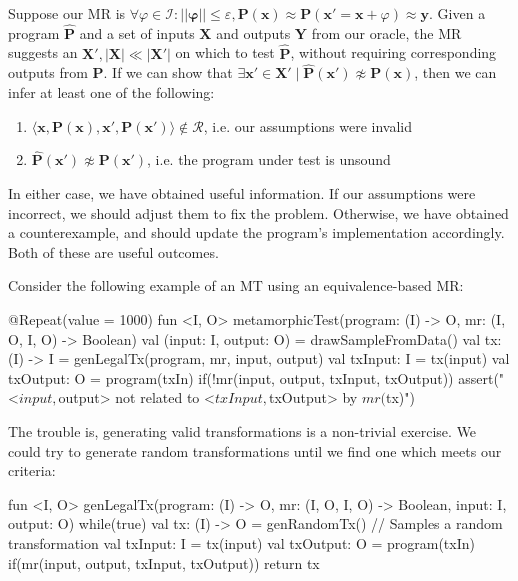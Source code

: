 \documentclass[12pt,initial,twoside,maitrise]{dms}
\numberwithin{equation}{section}
\numberwithin{table}{chapter}
\numberwithin{figure}{chapter}
\begin{document}
Suppose our MR is $\forall \varphi \in \mathcal I: ||\mathbf\varphi|| \leq \varepsilon, \mathbf P(\mathbf x) \approx \mathbf P(\mathbf x' = \mathbf x + \varphi) \approx \mathbf y$. Given a program $\mathbf{\hat P}$ and a set of inputs $\mathbf X$ and outputs $\mathbf Y$ from our oracle, the MR suggests an $\mathbf X', |\mathbf X| \ll |\mathbf X'|$ on which to test $\mathbf{\hat P}$, without requiring corresponding outputs from $\mathbf P$. If we can show that $\exists \mathbf x' \in \mathbf X' \mid \mathbf{\hat P}(\mathbf x') \not\approx \mathbf P(\mathbf x)$, then we can infer at least one of the following:

\begin{enumerate}
\item $\langle \mathbf x, \mathbf P(\mathbf x), \mathbf x', \mathbf P(\mathbf x')\rangle \notin \mathcal R$, i.e. our assumptions were invalid
\item $\mathbf{\hat P}(\mathbf x') \not\approx \mathbf{P}(\mathbf x')$, i.e. the program under test is unsound
\end{enumerate}
%
In either case, we have obtained useful information. If our assumptions were incorrect, we should adjust them to fix the problem. Otherwise, we have obtained a counterexample, and should update the program's implementation accordingly. Both of these are useful outcomes.

Consider the following example of an MT using an equivalence-based MR:

\begin{kotlinlisting}
@Repeat(value = 1000)
fun <I, O> metamorphicTest(program: (I) -> O, mr: (I, O, I, O) -> Boolean) {
    val (input: I, output: O) = drawSampleFromData()
    val tx: (I) -> I = genLegalTx(program, mr, input, output)
    val txInput: I = tx(input)
    val txOutput: O = program(txIn)
    if(!mr(input, output, txInput, txOutput))
        assert("<$input, $output> not related to <$txInput, $txOutput> by $mr ($tx)")
}
\end{kotlinlisting}
%
The trouble is, generating valid transformations is a non-trivial exercise. We could try to generate random transformations until we find one which meets our criteria:
%
\begin{kotlinlisting}
fun <I, O> genLegalTx(program: (I) -> O, mr: (I, O, I, O) -> Boolean, input: I, output: O) {
    while(true) {
        val tx: (I) -> O = genRandomTx() // Samples a random transformation
        val txInput: I = tx(input)
        val txOutput: O = program(txIn)
        if(mr(input, output, txInput, txOutput)) return tx
    }
}
\end{kotlinlisting}
\end{document}
